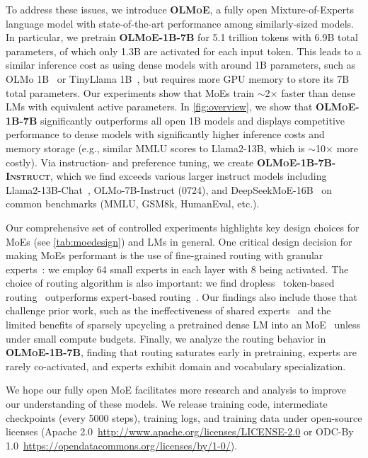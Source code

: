 \documentclass{article}
\newcommand{\model}{\textbf{\textsc{OLMoE}}}
\newcommand{\modelsmall}{\textbf{\textsc{OLMoE-1B-7B}}}
\newcommand{\modelsmalldpo}{\textbf{\textsc{OLMoE-1B-7B-Instruct}}}
\begin{document}
To address these issues, we introduce \model{}, a fully open Mixture-of-Experts language model with state-of-the-art performance among similarly-sized models. In particular, we pretrain \modelsmall{} for 5.1 trillion tokens with 6.9B total parameters, of which only 1.3B are activated for each input token. This leads to a similar inference cost as using dense models with around 1B parameters, such as OLMo 1B~\citep{groeneveld2024olmo} or TinyLlama 1B~\citep{zhang2024tinyllamaopensourcesmalllanguage}, but requires more GPU memory to store its 7B total parameters. Our experiments show that MoEs train $\sim$2$\times$ faster than dense LMs with equivalent active parameters. In \autoref{fig:overview}, we show that \modelsmall{} significantly outperforms all open 1B models and displays competitive performance to dense models with significantly higher inference costs and memory storage (e.g., similar MMLU scores to Llama2-13B, which is $\sim$10$\times$ more costly). Via instruction- and preference tuning, we create \modelsmalldpo{}, which we find exceeds various larger instruct models including Llama2-13B-Chat~\citep{touvron2023llama2openfoundation}, OLMo-7B-Instruct (0724), and DeepSeekMoE-16B~\citep{deepseekai2024deepseek} on common benchmarks (MMLU, GSM8k, HumanEval, etc.).

Our comprehensive set of controlled experiments highlights key design choices for MoEs (see \autoref{tab:moedesign}) and LMs in general. One critical design decision for making MoEs performant is the use of fine-grained routing with granular experts~\citep{deepseekai2024deepseek}: we employ 64 small experts in each layer with 8 being activated. The choice of routing algorithm is also important: we find dropless~\citep{gale2022megablocksefficientsparsetraining} token-based routing~\citep{shazeer2017outrageously} outperforms expert-based routing~\citep{zhou2022mixtureofexperts}. Our findings also include those that challenge prior work, such as the ineffectiveness of shared experts~\citep{deepseekai2024deepseek} and the limited benefits of sparsely upcycling a pretrained dense LM into an MoE~\citep{komatsuzaki2023sparse} unless under small compute budgets. Finally, we analyze the routing behavior in \modelsmall{}, finding that routing saturates early in pretraining, experts are rarely co-activated, and experts exhibit domain and vocabulary specialization. 

We hope our fully open MoE facilitates more research and analysis to improve our understanding of these models. We release training code, intermediate checkpoints (every 5000 steps), training logs, and training data under open-source licenses (Apache 2.0~{\url{http://www.apache.org/licenses/LICENSE-2.0}} or ODC-By 1.0~{\url{https://opendatacommons.org/licenses/by/1-0/}}).
\end{document}
